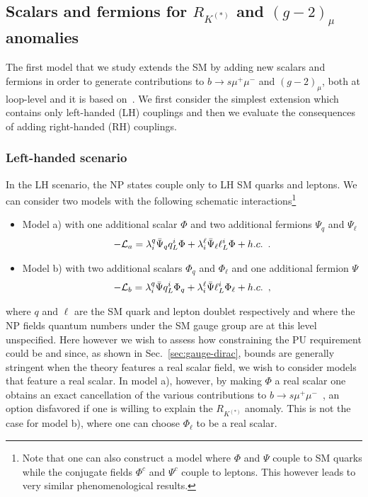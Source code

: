 \documentclass[a4paper,11pt]{article}
\begin{document}

\subsection{Scalars and fermions for $R_{K^{(*)}}$ and $(g-2)_\mu$ anomalies}



The first model that we study extends the SM by adding new scalars and fermions in order to generate contributions to $b\to s \mu^+ \mu^-$ and $(g-2)_\mu$, both at loop-level  and it is based on~\cite{Gripaios:2015gra,Arnan:2016cpy}. We first consider the simplest extension which contains only left-handed (LH) couplings and then we evaluate the consequences of adding right-handed (RH) couplings.
\subsubsection{Left-handed scenario}\label{eq:LH}
In the LH scenario, the NP states couple only to LH SM quarks and leptons. We can consider two models with the following schematic interactions\footnote{Note that one can also construct a model where $\Phi$ and $\Psi$ couple to SM quarks while the conjugate fields $\Phi^c$ and $\Psi^c$ couple to leptons. This however leads to very similar phenomenological results.}\begin{itemize}
\item Model a) with one additional scalar $\Phi$ and two additional fermions $\Psi_q$ and $\Psi_\ell$ 
\begin{eqnarray}
-{\cal L}_{a} =  {\lambda^q_i\bar \Psi_q }{q^i_L}{\Phi} + \lambda^\ell_i \bar \Psi_\ell {\ell_L^i }{\Phi} +
h.c. \, \ . 
\label{eq:Linta}
\end{eqnarray}
\item Model b) with two additional scalars $\Phi_q$ and $\Phi_\ell$ and one additional fermion $\Psi$ 
\begin{eqnarray}
-{\cal L}_{b}=  {\lambda^q_i\bar \Psi }{q_L^i}{\Phi_q} + \lambda^\ell_i \bar \Psi {\ell_L^i}{\Phi_\ell} +
h.c. \, \ ,
\label{eq:Lintb}
\end{eqnarray}
\end{itemize}
where $q$ and $\ell$ are the SM quark and lepton doublet respectively and where the NP fields quantum numbers under the SM gauge group are at this level unspecified. Here however we wish to assess how constraining the PU requirement could be and since, as shown in Sec.~\ref{sec:gauge-dirac}, bounds are generally stringent when the theory features a real scalar field, we wish to consider models that feature a real scalar. In model a), however, by making $\Phi$ a real scalar one obtains an exact cancellation of the various contributions to $b\to s\mu^+\mu^-$~\cite{Arnan:2019uhr}, an option disfavored if one is willing to explain the $R_{K^{(*)}}$ anomaly. This is not the case for model b), where one can choose $\Phi_\ell$ to be a real scalar.
\end{document}
